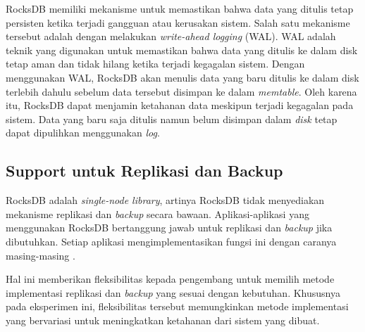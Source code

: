 RocksDB memiliki mekanisme untuk memastikan bahwa data yang ditulis tetap persisten ketika terjadi gangguan atau kerusakan sistem. Salah satu mekanisme tersebut adalah dengan melakukan \textit{write-ahead logging} (WAL). WAL adalah teknik yang digunakan untuk memastikan bahwa data yang ditulis ke dalam disk tetap aman dan tidak hilang ketika terjadi kegagalan sistem. Dengan menggunakan WAL, RocksDB akan menulis data yang baru ditulis ke dalam disk terlebih dahulu sebelum data tersebut disimpan ke dalam \textit{memtable}. Oleh karena itu, RocksDB dapat menjamin ketahanan data meskipun terjadi kegagalan pada sistem. Data yang baru saja ditulis namun belum disimpan dalam \textit{disk} tetap dapat dipulihkan menggunakan \textit{log}.

\subsection{Support untuk Replikasi dan Backup}

RocksDB adalah \textit{single-node library}, artinya RocksDB tidak menyediakan mekanisme replikasi dan \textit{backup} secara bawaan. Aplikasi-aplikasi yang menggunakan RocksDB bertanggung jawab untuk replikasi dan \textit{backup} jika dibutuhkan. Setiap aplikasi mengimplementasikan fungsi ini dengan caranya masing-masing \parencite{dong2021rocksdb}. 

Hal ini memberikan fleksibilitas kepada pengembang untuk memilih metode implementasi replikasi dan \textit{backup} yang sesuai dengan kebutuhan. Khususnya pada eksperimen ini, fleksibilitas tersebut memungkinkan metode implementasi yang bervariasi untuk meningkatkan ketahanan dari sistem yang dibuat.